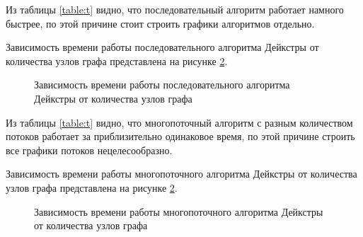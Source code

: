 \documentclass[a4paper,14pt, unknownkeysallowed]{extreport}
\begin{document}
Из таблицы \ref{table:t} видно, что последовательный алгоритм работает намного быстрее, по этой причине стоит строить графики алгоритмов отдельно.

Зависимость времени работы последовательного алгоритма Дейкстры от количества узлов графа представлена на рисунке \ref{ris}.

\begin{center}
	\begin{figure}[h!]
	\center
	\caption{Зависимость времени работы последовательного алгоритма Дейкстры от количества узлов графа}
	\label{ris}
	\end{figure}
\end{center}

Из таблицы \ref{table:t} видно, что многопоточный алгоритм с разным количеством потоков работает за приблизительно одинаковое время, по этой причине строить все графики потоков нецелесообразно.

Зависимость времени работы многопоточного алгоритма Дейкстры от количества узлов графа представлена на рисунке \ref{ris}.

\begin{center}
	\begin{figure}[h!]
	\center
	\caption{Зависимость времени работы многопоточного алгоритма Дейкстры от количества узлов графа}
	\label{ris}
	\end{figure}
\end{center}
	
\end{document}
